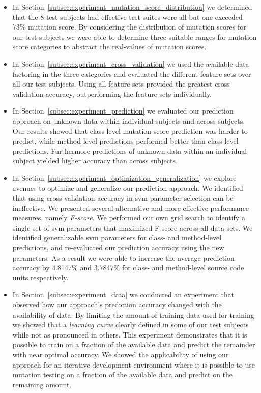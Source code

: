 \begin{itemize}
  \item In Section~\ref{subsec:experiment_mutation_score_distribution} we determined that the 8 test subjects had effective test suites were all but one exceeded 73\% mutation score. By considering the distribution of mutation scores for our test subjects we were able to determine three suitable ranges for mutation score categories to abstract the real-values of mutation scores.
  \item In Section~\ref{subsec:experiment_cross_validation} we used the available data factoring in the three categories and evaluated the different feature sets over all our test subjects. Using all feature sets provided the greatest cross-validation accuracy, outperforming the feature sets individually.
  \item In Section~\ref{subsec:experiment_prediction} we evaluated our prediction approach on unknown data within individual subjects and across subjects. Our results showed that class-level mutation score prediction was harder to predict, while method-level predictions performed better than class-level predictions. Furthermore predictions of unknown data within an individual subject yielded higher accuracy than across subjects.
  \item In Section~\ref{subsec:experiment_optimization_generalization} we explore avenues to optimize and generalize our prediction approach. We identified that using cross-validation accuracy in \gls{svm} parameter selection can be ineffective. We presented several alternative and more effective performance measures, namely \emph{F-score}. We performed our own grid search to identify a single set of \gls{svm} parameters that maximized F-score across all data sets. We identified generalizable \gls{svm} parameters for class- and method-level predictions, and re-evaluated our prediction accuracy using the new parameters. As a result we were able to increase the average prediction accuracy by 4.8147\% and 3.7847\% for class- and method-level source code units respectively.
  \item In Section~\ref{subsec:experiment_data} we conducted an experiment that observed how our approach's prediction accuracy changed with the availability of data. By limiting the amount of training data used for training we showed that a \emph{learning curve} clearly defined in some of our test subjects while not as pronounced in others. This experiment demonstrates that it is possible to train on a fraction of the available data and predict the remainder with near optimal accuracy. We showed the applicability of using our approach for an iterative development environment where it is possible to use mutation testing on a fraction of the available data and predict on the remaining amount.
\end{itemize}


